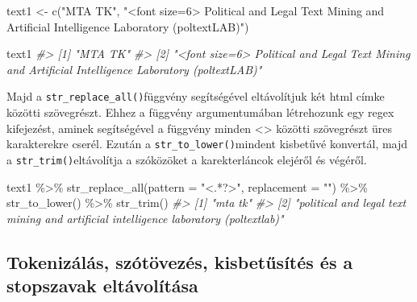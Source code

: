 \documentclass[
]{book}
\newenvironment{Shaded}{\begin{snugshade}}{\end{snugshade}}
\newcommand{\AttributeTok}[1]{\textcolor[rgb]{0.77,0.63,0.00}{#1}}
\newcommand{\CommentTok}[1]{\textcolor[rgb]{0.56,0.35,0.01}{\textit{#1}}}
\newcommand{\FunctionTok}[1]{\textcolor[rgb]{0.00,0.00,0.00}{#1}}
\newcommand{\NormalTok}[1]{#1}
\newcommand{\OtherTok}[1]{\textcolor[rgb]{0.56,0.35,0.01}{#1}}
\newcommand{\SpecialCharTok}[1]{\textcolor[rgb]{0.00,0.00,0.00}{#1}}
\newcommand{\StringTok}[1]{\textcolor[rgb]{0.31,0.60,0.02}{#1}}
\begin{document}
\begin{Shaded}
\begin{Highlighting}[]

\NormalTok{text1 }\OtherTok{\textless{}{-}} \FunctionTok{c}\NormalTok{(}\StringTok{"MTA TK"}\NormalTok{, }\StringTok{"\textless{}font size=\textquotesingle{}6\textquotesingle{}\textgreater{} Political and Legal Text Mining and Artificial Intelligence Laboratory (poltextLAB)"}\NormalTok{)}

\NormalTok{text1}
\CommentTok{\#\textgreater{} [1] "MTA TK"                                                                                             }
\CommentTok{\#\textgreater{} [2] "\textless{}font size=\textquotesingle{}6\textquotesingle{}\textgreater{} Political and Legal Text Mining and Artificial Intelligence Laboratory (poltextLAB)"}
\end{Highlighting}
\end{Shaded}

Majd a \texttt{str\_replace\_all()}függvény segítségével eltávolítjuk
két html címke közötti szövegrészt. Ehhez a függvény argumentumában
létrehozunk egy regex kifejezést, aminek segítségével a függvény minden
\textless\textgreater{} közötti szövegrészt üres karakterekre cserél.
Ezután a \texttt{str\_to\_lower()}mindent kisbetűvé konvertál, majd a
\texttt{str\_trim()}eltávolítja a szóközöket a karekterláncok elejéről
és végéről.

\begin{Shaded}
\begin{Highlighting}[]

\NormalTok{text1 }\SpecialCharTok{\%\textgreater{}\%}
  \FunctionTok{str\_replace\_all}\NormalTok{(}\AttributeTok{pattern =} \StringTok{"\textless{}.*?\textgreater{}"}\NormalTok{, }\AttributeTok{replacement =} \StringTok{""}\NormalTok{) }\SpecialCharTok{\%\textgreater{}\%}
  \FunctionTok{str\_to\_lower}\NormalTok{() }\SpecialCharTok{\%\textgreater{}\%}
  \FunctionTok{str\_trim}\NormalTok{()}
\CommentTok{\#\textgreater{} [1] "mta tk"                                                                             }
\CommentTok{\#\textgreater{} [2] "political and legal text mining and artificial intelligence laboratory (poltextlab)"}
\end{Highlighting}
\end{Shaded}

\hypertarget{tokenizuxe1luxe1s-szuxf3tuxf6vezuxe9s-kisbetux171suxedtuxe9s-uxe9s-a-stopszavak-eltuxe1voluxedtuxe1sa}{%
\subsection{Tokenizálás, szótövezés, kisbetűsítés és a stopszavak
eltávolítása}\label{tokenizuxe1luxe1s-szuxf3tuxf6vezuxe9s-kisbetux171suxedtuxe9s-uxe9s-a-stopszavak-eltuxe1voluxedtuxe1sa}}
\end{document}
